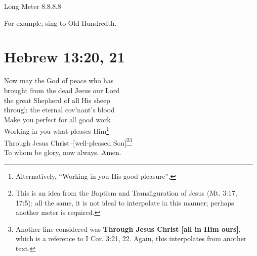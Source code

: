\documentclass{article}
\begin{document}
\noindent Long Meter 8.8.8.8

\noindent For example, sing to Old Hundredth.

\section*{Hebrew 13:20, 21}

 Now may the God of peace who has\\
brought from the dead Jesus our Lord\\
the great Shepherd of all His sheep\\
through the eternal cov'nant's blood\\

 Make you perfect for all good work\\
Working in you what pleases Him\footnote{Alternatively, ``Working in you His good pleasure'',}\\
Through Jesus Christ--[well-pleased Son]\footnote{This is an idea from the Baptism and Transfiguration of Jesus (Mt. 3:17, 17:5); all the same, it is not ideal to interpolate in this manner; perhaps another meter is required.}\footnote{Another line considered was \textbf{Through Jesus Christ [all in Him ours]}, which is a reference to I Cor. 3:21, 22. Again, this interpolates from another text.}\\
To whom be glory, now always. Amen.
\end{document}
